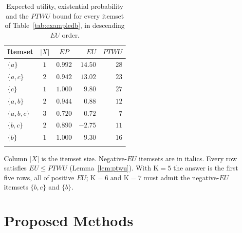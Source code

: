 \documentclass[pdflatex,sn-vancouver-num]{sn-jnl}
\theoremstyle{thmstyleone}%
\theoremstyle{thmstyletwo}%
\theoremstyle{thmstylethree}%
\newcommand{\EU}{\mathit{EU}}
\newcommand{\EP}{\mathit{EP}}
\newcommand{\PTWU}{\mathit{PTWU}}
\newcommand{\Kk}{\mathrm{K}}
\begin{document}
\begin{table}[t]
\caption{Expected utility, existential probability and the $\PTWU$
bound for every itemset of Table~\ref{tab:exampledb}, in descending
$\EU$ order.}\label{tab:exampleeu}
\begin{tabular}{@{}lccrr@{}}
\toprule
Itemset & $|X|$ & $\EP$ & $\EU$ & $\PTWU$ \\
\midrule
$\{a\}$              & $1$ & $0.992$ & $14.50$ & $28$ \\
$\{a,c\}$            & $2$ & $0.942$ & $13.02$ & $23$ \\
$\{c\}$              & $1$ & $1.000$ & $9.80$  & $27$ \\
$\{a,b\}$            & $2$ & $0.944$ & $0.88$  & $12$ \\
$\{a,b,c\}$          & $3$ & $0.720$ & $0.72$  & $7$  \\
\textit{$\{b,c\}$}   & $2$ & $0.890$ & \textit{$-2.75$} & $11$ \\
\textit{$\{b\}$}     & $1$ & $1.000$ & \textit{$-9.30$} & $16$ \\
\botrule
\end{tabular}
\vspace{2pt}
 
{\footnotesize Column $|X|$ is the itemset size. Negative-$\EU$ itemsets
are in italics. Every row satisfies $\EU\le\PTWU$
(Lemma~\ref{lem:ptwu}). With $\Kk=5$ the answer is the first five rows,
all of positive $\EU$; $\Kk=6$ and $\Kk=7$ must admit the negative-$\EU$
itemsets $\{b,c\}$ and $\{b\}$.}
\end{table}

\section{Proposed Methods}\label{sec:methods}
\end{document}
